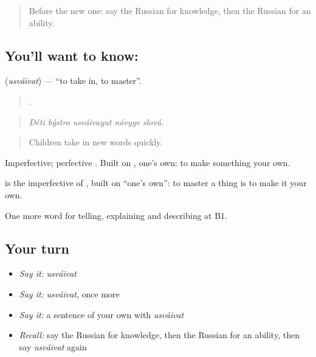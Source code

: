 \label{lesson:RU-C387-usvaivat}



\begin{quote}
Before the new one: say the Russian for knowledge, then the Russian for an ability.
\end{quote}

\subsection*{You'll want to know: }
\textbf{} (\emph{usváivat}) — \textquotedblleft{}to take in, to master\textquotedblright{}.

\begin{quote}
    .
\end{quote}

\begin{quote}
\emph{Déti býstro usváivayut nóvyye slová.}
\end{quote}

\begin{quote}
Children take in new words quickly.
\end{quote}

Imperfective; perfective \emph{}. Built on \emph{}, one’s own: to make something your own.

\begin{cousinweb}
\textbf{} is the imperfective of \emph{}, built on \emph{} \textquotedblleft{}one’s own\textquotedblright{}: to master a thing is to make it your own.
\end{cousinweb}

\begin{grammarlens}[title={What you've built}]
One more word for telling, explaining and describing at B1.
\end{grammarlens}

\subsection*{Your turn}
\begin{itemize}
\raggedright
  \item \emph{Say it:} \emph{usváivat}
  \item \emph{Say it:} \emph{usváivat}, once more
  \item \emph{Say it:} a sentence of your own with \emph{usváivat}
  \item \emph{Recall:} say the Russian for knowledge, then the Russian for an ability, then say \emph{usváivat} again
\end{itemize}

